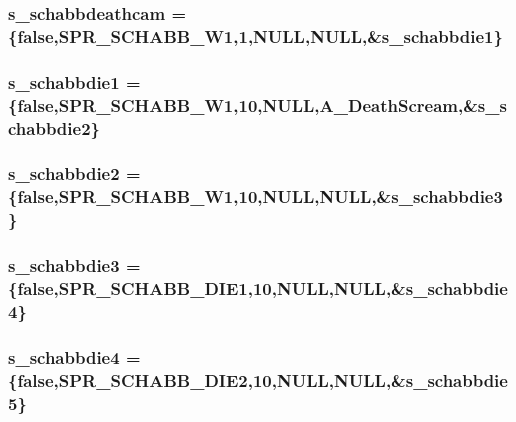\label{WL__ACT2_8C_ab0fd2868bb492ae069b33cb3fd3dc445}
\hypertarget{WL__ACT2_8C_aacdd4aceca1af97b105487c3140e77b1}{
\subsubsection[{s\_\-schabbdeathcam}]{ {\bf s\_\-schabbdeathcam} = \{false,SPR\_\-SCHABB\_\-W1,1,NULL,NULL,\&{\bf s\_\-schabbdie1}\}}}
\label{WL__ACT2_8C_aacdd4aceca1af97b105487c3140e77b1}
\hypertarget{WL__ACT2_8C_a893439687b453e85400bf0010c99a361}{
\subsubsection[{s\_\-schabbdie1}]{ {\bf s\_\-schabbdie1} = \{false,SPR\_\-SCHABB\_\-W1,10,NULL,A\_\-DeathScream,\&{\bf s\_\-schabbdie2}\}}}
\label{WL__ACT2_8C_a893439687b453e85400bf0010c99a361}
\hypertarget{WL__ACT2_8C_a6965c5d612fd363b8f47f13b17d2c0d0}{
\subsubsection[{s\_\-schabbdie2}]{ {\bf s\_\-schabbdie2} = \{false,SPR\_\-SCHABB\_\-W1,10,NULL,NULL,\&{\bf s\_\-schabbdie3}\}}}
\label{WL__ACT2_8C_a6965c5d612fd363b8f47f13b17d2c0d0}
\hypertarget{WL__ACT2_8C_aff88f82fca52e5165b0754c76bca3d92}{
\subsubsection[{s\_\-schabbdie3}]{ {\bf s\_\-schabbdie3} = \{false,SPR\_\-SCHABB\_\-DIE1,10,NULL,NULL,\&{\bf s\_\-schabbdie4}\}}}
\label{WL__ACT2_8C_aff88f82fca52e5165b0754c76bca3d92}
\hypertarget{WL__ACT2_8C_a0264665a73e503feeb4394daeaf1f725}{
\subsubsection[{s\_\-schabbdie4}]{ {\bf s\_\-schabbdie4} = \{false,SPR\_\-SCHABB\_\-DIE2,10,NULL,NULL,\&{\bf s\_\-schabbdie5}\}}}
